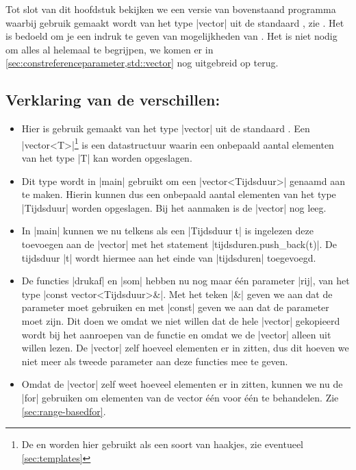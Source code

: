 \begin{cpplstShortInline}
Tot slot van dit hoofdstuk bekijken we een versie van bovenstaand programma waarbij gebruik gemaakt wordt van het type |vector| uit de standaard , zie .
Het is bedoeld om je een indruk te geven van mogelijkheden van \Cpp{}.
Het is niet nodig om alles al helemaal te begrijpen, we komen er in \cref{sec:constreferenceparameter,std::vector} nog uitgebreid op terug.


\subsection*{Verklaring van de verschillen:}
\begin{itemize}
	\item 
	Hier is gebruik gemaakt van het type |vector| uit de standaard .
	Een |vector<T>|\footnote{%
		De \code{<} en \code{>} worden hier gebruikt als een soort van haakjes, zie eventueel \cref{sec:templates}
	} is een datastructuur waarin een onbepaald aantal elementen van het type |T| kan worden opgeslagen. 
	\item
	Dit type wordt in |main| gebruikt om een |vector<Tijdsduur>| genaamd  aan te maken.
	Hierin kunnen dus een onbepaald aantal elementen van het type |Tijdsduur| worden opgeslagen.
	Bij het aanmaken is de |vector| nog leeg.
	\item 
	In |main| kunnen we nu telkens als een |Tijdsduur t| is ingelezen deze toevoegen aan de |vector| met het statement |tijdsduren.push_back(t)|.
	De tijdsduur |t| wordt hiermee aan het einde van |tijdsduren| toegevoegd.
	\item 
	De functies |drukaf| en |som| hebben nu nog maar één parameter |rij|, van het type |const vector<Tijdsduur>&|.
	Met het teken |&| geven we aan dat de parameter  moet gebruiken en met |const| geven we aan dat de parameter  moet zijn.
	Dit doen we omdat we niet willen dat de hele |vector| gekopieerd wordt bij het aanroepen van de functie en omdat we de |vector| alleen uit willen lezen.
	De |vector|  zelf hoeveel elementen er in zitten, dus dit hoeven we niet meer als tweede parameter aan deze functies mee te geven.
	\item 
	Omdat de |vector| zelf weet hoeveel elementen er in zitten, kunnen we nu de  |for| gebruiken om elementen van de vector één voor één te behandelen.
	Zie \cref{sec:range-basedfor}.
\end{itemize}


\end{cpplstShortInline}
